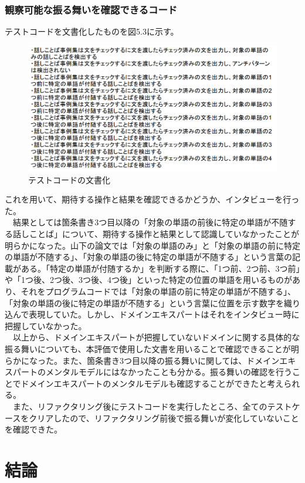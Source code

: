 \documentclass[12pt, a4paper]{jreport}
\begin{document}
\subsection{観察可能な振る舞いを確認できるコード}
テストコードを文書化したものを図5.3に示す。
\begin{figure}[H]
\centering
\includegraphics[width=1\linewidth]{image/hurumai.png}
\caption{テストコードの文書化}
\label{fig:enter-label}
\end{figure}
これを用いて、期待する操作と結果を確認できるかどうか、インタビューを行った。
\\　結果としては箇条書き3つ目以降の「対象の単語の前後に特定の単語が不随する話しことば」について、期待する操作と結果として認識していなかったことが明らかになった。山下の論文では「対象の単語のみ」と「対象の単語の前に特定の単語が不随する」、「対象の単語の後に特定の単語が不随する」という言葉の記載がある。「特定の単語が付随するか」を判断する際に、「1つ前、2つ前、3つ前」や「1つ後、2つ後、3つ後、4つ後」といった特定の位置の単語を用いるものがあり、それをプログラムコードでは「対象の単語の前に特定の単語が不随する」、「対象の単語の後に特定の単語が不随する」という言葉に位置を示す数字を織り込んで表現していた。しかし、ドメインエキスパートはそれをインタビュー時に把握していなかった。
\\　以上から、ドメインエキスパートが把握していないドメインに関する具体的な振る舞いについても、本評価で使用した文書を用いることで確認できることが明らかになった。また、箇条書き3つ目以降の振る舞いに関しては、ドメインエキスパートのメンタルモデルにはなかったことも分かる。振る舞いの確認を行うことでドメインエキスパートのメンタルモデルも確認することができたと考えられる。
\\　また、リファクタリング後にテストコードを実行したところ、全てのテストケースをクリアしたので、リファクタリング前後で振る舞いが変化していないことを確認できた。
\chapter{結論}
\end{document}
